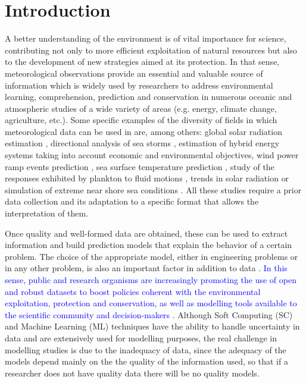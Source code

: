 \documentclass[energies,article,submit,moreauthors,pdftex]{Definitions/mdpi}
\begin{document}


	\section{Introduction}
		
		A better understanding of the environment is of vital importance for science, contributing not only to more efficient exploitation of natural resources but also to the development of new strategies aimed at its protection. In that sense, meteorological observations provide an essential and valuable source of information which is widely used by researchers to address environmental learning, comprehension, prediction and conservation in numerous oceanic and atmospheric studies of a wide variety of areas (e.g. energy, climate change, agriculture, etc.). Some specific examples of the diversity of fields in which meteorological data can be used in are, among others: global solar radiation estimation \cite{SHAHRUKHANIS2019179}, directional analysis of sea storms \cite{LAFACE201545}, estimation of hybrid energy systems taking into account economic and environmental objectives\cite{Kumar2020}, wind power ramp events prediction \cite{DORADOMORENO2017428}, sea surface temperature prediction \cite{He2020}, study of the responses exhibited by plankton to fluid motions \cite{FUCHS2016109}, trends in solar radiation \cite{SILVA20101852} or simulation of extreme near shore sea conditions \cite{GOULDBY201415}. All these studies require a prior data collection and its adaptation to a specific format that allows the interpretation of them.
		
		Once quality and well-formed data are obtained, these can be used to extract information and build prediction models that explain the behavior of a certain problem. The choice of the appropriate model, either in engineering problems or in any other problem, is also an important factor in addition to data \cite{Alizadeh2019, Alizadeh2020}. \textcolor{blue}{In this sense, public and research organisms are increasingly promoting the use of open and robust datasets to boost policies coherent with the environmental exploitation, protection and conservation, as well as modelling tools available to the scientific community and decision-makers \cite{Manfren2020}}. Although Soft Computing (SC) and Machine Learning (ML) techniques have the ability to handle uncertainty in data and are extensively used for modelling purposes, the real challenge in modelling studies is due to the inadequacy of data, since the adequacy of the models depend mainly on the the quality of the information used, so that if a researcher does not have quality data there will be no quality models.
		
\end{document}
